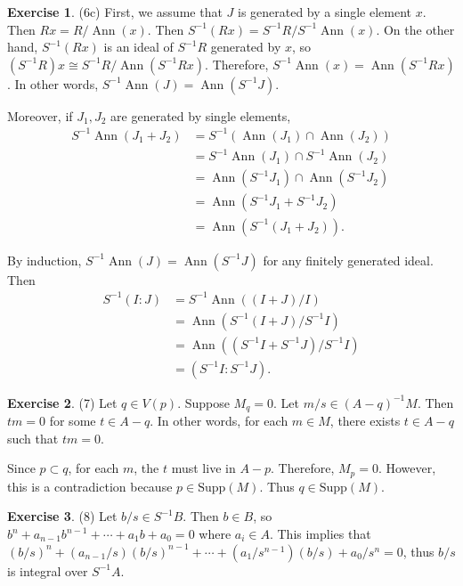 \documentclass[12pt, psamsfonts]{amsart}
\theoremstyle{definition}
\newtheorem*{exer}{Exercise}
\theoremstyle{remark}
\DeclareMathOperator{\Ann}{Ann}
\numberwithin{equation}{section}
\begin{document}
\begin{exer}{(6c)}
  First, we assume that $J$ is generated by a single element $x$.
  Then $Rx = R / \Ann(x)$.
  Then $S^{-1}(Rx) = S^{-1}R / S^{-1}\Ann(x)$.
  On the other hand, $S^{-1}(Rx)$ is an ideal of $S^{-1}R$ generated by $x$, so $(S^{-1}R)x \cong S^{-1}R / \Ann(S^{-1}Rx)$.
  Therefore, $S^{-1}\Ann(x) = \Ann(S^{-1}Rx)$.
  In other words, $S^{-1}\Ann(J) = \Ann(S^{-1}J)$.

  Moreover, if $J_1, J_2$ are generated by single elements, 
  \begin{align*}
    S^{-1}\Ann(J_1 + J_2)
      &= S^{-1}(\Ann(J_1) \cap \Ann(J_2)) \\
      &= S^{-1}\Ann(J_1) \cap S^{-1}\Ann(J_2) \\
      &= \Ann(S^{-1}J_1) \cap \Ann(S^{-1}J_2) \\
      &= \Ann(S^{-1}J_1 + S^{-1}J_2) \\
      &= \Ann(S^{-1}(J_1 + J_2)).
  \end{align*}

  By induction, $S^{-1}\Ann(J) = \Ann(S^{-1}J)$ for any finitely generated ideal.
  Then 
  \begin{align*}
    S^{-1}(I:J)
      &= S^{-1}\Ann((I + J) / I) \\
      &= \Ann(S^{-1}(I + J) / S^{-1}I) \\
      &= \Ann((S^{-1}I + S^{-1}J) / S^{-1}I) \\
      &= (S^{-1}I:S^{-1}J).
  \end{align*}
\end{exer}

\begin{exer}{(7)}
  Let $q \in V(p)$.
  Suppose $M_q = 0$.
  Let $m / s \in (A - q)^{-1}M$.
  Then $tm = 0$ for some $t \in A - q$.
  In other words, for each $m \in M$, there exists $t \in A - q$ such that $tm = 0$.

  Since $p \subset q$, for each $m$, the $t$ must live in $A - p$.
  Therefore, $M_p = 0$.
  However, this is a contradiction because $p \in \text{Supp}(M)$.
  Thus $q \in \text{Supp}(M)$.
\end{exer}

\begin{exer}{(8)}
  Let $b / s \in S^{-1}B$.
  Then $b \in B$, so $b^n + a_{n - 1}b^{n - 1} + \cdots + a_1b + a_0 = 0$ where $a_i \in A$.
  This implies that $(b / s)^n + (a_{n - 1} / s)(b / s)^{n - 1} + \cdots + (a_1 / s^{n - 1})(b / s) + a_0 / s^n = 0$, thus $b / s$ is integral over $S^{-1}A$.
\end{exer}
\end{document}
